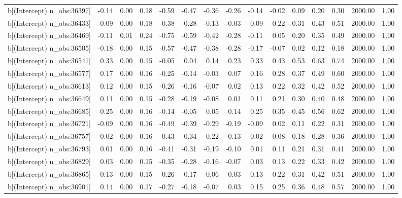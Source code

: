 \begin{table}[ht]
\begin{tabular}{rrrrrrrrrrrrrrr}
  b[(Intercept) n\_obs:36397] & -0.14 & 0.00 & 0.18 & -0.59 & -0.47 & -0.36 & -0.26 & -0.14 & -0.02 & 0.09 & 0.20 & 0.30 & 2000.00 & 1.00 \\ 
  b[(Intercept) n\_obs:36433] & 0.09 & 0.00 & 0.18 & -0.38 & -0.28 & -0.13 & -0.03 & 0.09 & 0.22 & 0.31 & 0.43 & 0.51 & 2000.00 & 1.00 \\ 
  b[(Intercept) n\_obs:36469] & -0.11 & 0.01 & 0.24 & -0.75 & -0.59 & -0.42 & -0.28 & -0.11 & 0.05 & 0.20 & 0.35 & 0.49 & 2000.00 & 1.00 \\ 
  b[(Intercept) n\_obs:36505] & -0.18 & 0.00 & 0.15 & -0.57 & -0.47 & -0.38 & -0.28 & -0.17 & -0.07 & 0.02 & 0.12 & 0.18 & 2000.00 & 1.00 \\ 
  b[(Intercept) n\_obs:36541] & 0.33 & 0.00 & 0.15 & -0.05 & 0.04 & 0.14 & 0.23 & 0.33 & 0.43 & 0.53 & 0.63 & 0.74 & 2000.00 & 1.00 \\ 
  b[(Intercept) n\_obs:36577] & 0.17 & 0.00 & 0.16 & -0.25 & -0.14 & -0.03 & 0.07 & 0.16 & 0.28 & 0.37 & 0.49 & 0.60 & 2000.00 & 1.00 \\ 
  b[(Intercept) n\_obs:36613] & 0.12 & 0.00 & 0.15 & -0.26 & -0.16 & -0.07 & 0.02 & 0.13 & 0.22 & 0.32 & 0.42 & 0.52 & 2000.00 & 1.00 \\ 
  b[(Intercept) n\_obs:36649] & 0.11 & 0.00 & 0.15 & -0.28 & -0.19 & -0.08 & 0.01 & 0.11 & 0.21 & 0.30 & 0.40 & 0.48 & 2000.00 & 1.00 \\ 
  b[(Intercept) n\_obs:36685] & 0.25 & 0.00 & 0.16 & -0.14 & -0.05 & 0.05 & 0.14 & 0.25 & 0.35 & 0.45 & 0.56 & 0.62 & 2000.00 & 1.00 \\ 
  b[(Intercept) n\_obs:36721] & -0.09 & 0.00 & 0.16 & -0.49 & -0.39 & -0.29 & -0.19 & -0.09 & 0.02 & 0.11 & 0.22 & 0.31 & 2000.00 & 1.00 \\ 
  b[(Intercept) n\_obs:36757] & -0.02 & 0.00 & 0.16 & -0.43 & -0.34 & -0.22 & -0.13 & -0.02 & 0.08 & 0.18 & 0.28 & 0.36 & 2000.00 & 1.00 \\ 
  b[(Intercept) n\_obs:36793] & 0.01 & 0.00 & 0.16 & -0.41 & -0.31 & -0.19 & -0.10 & 0.01 & 0.11 & 0.21 & 0.31 & 0.41 & 2000.00 & 1.00 \\ 
  b[(Intercept) n\_obs:36829] & 0.03 & 0.00 & 0.15 & -0.35 & -0.28 & -0.16 & -0.07 & 0.03 & 0.13 & 0.22 & 0.33 & 0.42 & 2000.00 & 1.00 \\ 
  b[(Intercept) n\_obs:36865] & 0.13 & 0.00 & 0.15 & -0.26 & -0.17 & -0.06 & 0.03 & 0.13 & 0.22 & 0.31 & 0.42 & 0.51 & 2000.00 & 1.00 \\ 
  b[(Intercept) n\_obs:36901] & 0.14 & 0.00 & 0.17 & -0.27 & -0.18 & -0.07 & 0.03 & 0.15 & 0.25 & 0.36 & 0.48 & 0.57 & 2000.00 & 1.00 \\ 

\end{tabular}
\end{table}
